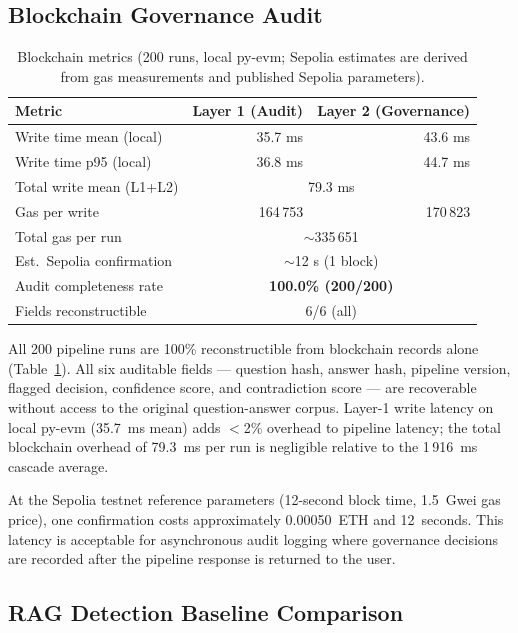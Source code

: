 \documentclass[11pt,a4paper]{article}
\begin{document}
\subsection{Blockchain Governance Audit}
\label{sec:blockchain}

\begin{table}[htb]
\centering
\caption{Blockchain metrics (200 runs, local py-evm; Sepolia estimates are
derived from gas measurements and published Sepolia parameters).}
\label{tab:blockchain}
\begin{tabular}{lrr}
\toprule
\textbf{Metric} & \textbf{Layer 1 (Audit)} & \textbf{Layer 2 (Governance)} \\
\midrule
Write time mean (local)     & 35.7 ms    & 43.6 ms \\
Write time p95 (local)      & 36.8 ms    & 44.7 ms \\
Total write mean (L1+L2)    & \multicolumn{2}{c}{79.3 ms} \\
Gas per write               & 164\,753   & 170\,823 \\
Total gas per run           & \multicolumn{2}{c}{$\sim$335\,651} \\
Est.\ Sepolia confirmation  & \multicolumn{2}{c}{$\sim$12 s (1 block)} \\
\midrule
Audit completeness rate     & \multicolumn{2}{c}{\textbf{100.0\% (200/200)}} \\
Fields reconstructible      & \multicolumn{2}{c}{6/6 (all)} \\
\bottomrule
\end{tabular}
\end{table}

All 200 pipeline runs are 100\% reconstructible from blockchain records alone
(Table~\ref{tab:blockchain}). All six auditable fields --- question hash, answer
hash, pipeline version, flagged decision, confidence score, and contradiction
score --- are recoverable without access to the original question-answer corpus.
Layer-1 write latency on local py-evm (35.7~ms mean) adds $<$2\% overhead to
pipeline latency; the total blockchain overhead of 79.3~ms per run is negligible
relative to the 1\,916~ms cascade average.

At the Sepolia testnet reference parameters (12-second block time, 1.5~Gwei gas
price), one confirmation costs approximately 0.00050~ETH and 12~seconds. This
latency is acceptable for asynchronous audit logging where governance decisions
are recorded after the pipeline response is returned to the user.

\subsection{RAG Detection Baseline Comparison}
\label{sec:ragbaseline}
\end{document}
